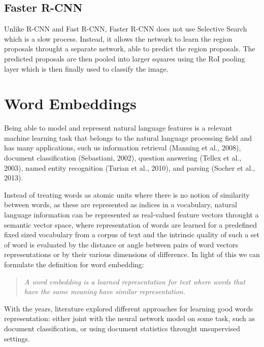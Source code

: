 \subsection{Faster R-CNN}

Unlike R-CNN and Fast R-CNN, Faster R-CNN does not use Selective
Search which is a slow process. Instead, it allows the network to
learn the region proposals throught a separate network, able to
predict the region proposals. The predicted proposals are then pooled
into larger squares using the RoI pooling layer which is then finally
used to classify the image.


\section{Word Embeddings}

Being able to model and represent natural language features is a
relevant machine learning task that belongs to the natural language
processing field and has many applications, such us information
retrieval (Manning et al., 2008), document classification (Sebastiani,
2002), question answering (Tellex et al., 2003), named entity
recognition (Turian et al., 2010), and parsing (Socher et al., 2013).

Instead of treating words as atomic units where there is no notion of
similarity between words, as these are represented as indices in a
vocabulary, natural language information can be represented as
real-valued feature vectors throught a semantic vector space, where
representation of words are learned for a predefined fixed sized
vocabulary from a corpus of text and the intrinsic quality of such a
set of word is evaluated by the distance or angle between pairs of
word vectors representations or by their various dimensions of
difference. In light of this we
can formulate the definition for word embedding: 

\begin{quote}
    \textit{A word embedding is a learned representation for text
    where words that have the same meaning have similar
    representation.}
\end{quote}

With the years, literature explored different approaches for learning
good words representation: either joint with the neural network model
on some task, such as document classification, or using document
statistics throught unsupervised settings.

